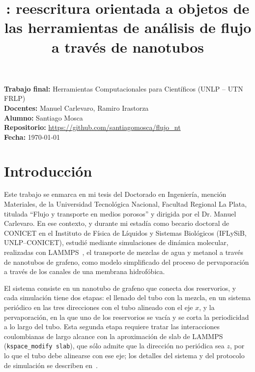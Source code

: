 \documentclass[11pt,a4paper]{article}
\title{\textbf{\Large \paquete: reescritura orientada a objetos de las
       herramientas de análisis de flujo a través de nanotubos}}
\author{}
\date{}
\newcommand{\urlrepositorio}{https://github.com/santiagomosca/flujo_nt}
\begin{document}
\maketitle
\vspace{-4em} %

\begin{flushleft}
\textbf{Trabajo final:} Herramientas Computacionales para Científicos
(UNLP -- UTN FRLP) \\
\textbf{Docentes:} Manuel Carlevaro, Ramiro Irastorza \\
\textbf{Alumno:} Santiago Mosca \\
\textbf{Repositorio:} \url{\urlrepositorio} \\
\textbf{Fecha:} \today
\end{flushleft}
\vspace{1em} %

\section{Introducción}

Este trabajo se enmarca en mi tesis del Doctorado en Ingeniería, mención
Materiales, de la Universidad Tecnológica Nacional, Facultad Regional La
Plata, titulada \enquote{Flujo y transporte en medios porosos} y dirigida por
el Dr. Manuel Carlevaro. En ese contexto, y durante mi estadía como becario
doctoral de CONICET en el Instituto de Física de Líquidos y Sistemas
Biológicos (IFLySiB, UNLP--CONICET), estudié mediante simulaciones de
dinámica molecular, realizadas con LAMMPS~\cite{lammps}, el transporte de
mezclas de agua y metanol a través de nanotubos de grafeno, como modelo
simplificado del proceso de pervaporación a través de los canales de una
membrana hidrofóbica.

El sistema consiste en un nanotubo de grafeno que conecta dos reservorios, y
cada simulación tiene dos etapas: el llenado del tubo con la mezcla, en un
sistema periódico en las tres direcciones con el tubo alineado con el eje
$x$, y la pervaporación, en la que uno de los reservorios se vacía y se corta
la periodicidad a lo largo del tubo. Esta segunda etapa requiere tratar las
interacciones coulombianas de largo alcance con la aproximación de slab de
LAMMPS (\texttt{kspace\_modify slab}), que sólo admite que la dirección no
periódica sea $z$, por lo que el tubo debe alinearse con ese eje; los
detalles del sistema y del protocolo de simulación se describen
en~\cite{mosca2025}.
\end{document}
